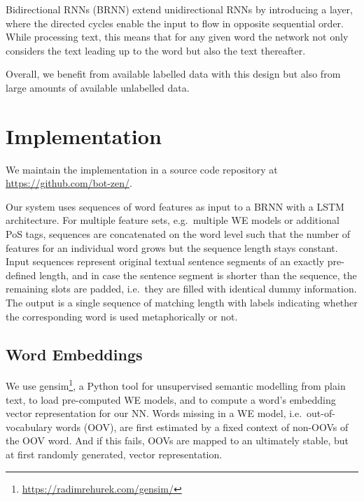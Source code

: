 \documentclass[11pt,a4paper]{article}
\begin{document}
Bidirectional RNNs (BRNN) \cite{Schuster1997BidirectionalNetworks} extend unidirectional RNNs by introducing a layer, where the directed cycles enable the input to flow in opposite sequential order. 
While processing text, this means that for any given word the network not only considers the text leading up to the word but also the text thereafter.

Overall, we benefit from available labelled data with this design but
also from large amounts of available unlabelled data.


\section{Implementation} %
\label{sec:implementation}

We maintain the implementation in a source code repository at
\url{https://github.com/bot-zen/}.  

Our system uses sequences of word features as input to a BRNN with a LSTM architecture.
For multiple feature sets, e.g.~multiple WE models or additional PoS tags, sequences are concatenated on the word level such that the number of features for an individual word grows but the sequence length stays constant.
Input sequences represent original textual sentence segments of an exactly pre-defined length, and in case the sentence segment is shorter than the sequence, the remaining slots are padded, i.e.~they are filled with identical dummy information.
The output is a single sequence of matching length with labels indicating whether the corresponding word is used metaphorically or not.


\subsection{Word Embeddings} %

We use gensim\footnote{\url{https://radimrehurek.com/gensim/}}, a Python tool for unsupervised semantic modelling from plain text, to load pre-computed WE models, and to compute a word's embedding vector representation for our {NN}.
Words missing in a WE model, i.e.~out-of-vocabulary words (OOV), are first estimated by a fixed context of non-OOVs of the OOV word.
And if this fails, OOVs are mapped to an ultimately stable, but at first randomly generated, vector representation.
\end{document}
